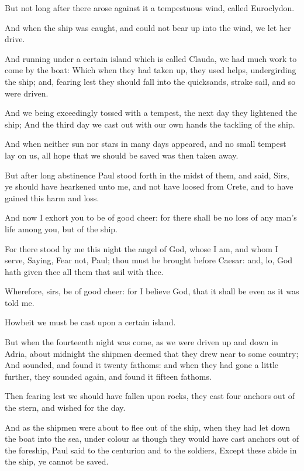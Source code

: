 \Verse But not long after there arose against it a tempestuous wind, called Euroclydon.

\Verse And when the ship was caught, and could not bear up into the wind, we let her drive.

\Verse And running under a certain island which is called Clauda, we had much work to come by the boat: \Verse Which when they had taken up, they used helps, undergirding the ship; and, fearing lest they should fall into the quicksands, strake sail, and so were driven.

\Verse And we being exceedingly tossed with a tempest, the next day they lightened the ship; \Verse And the third day we cast out with our own hands the tackling of the ship.

\Verse And when neither sun nor stars in many days appeared, and no small tempest lay on us, all hope that we should be saved was then taken away.

\Verse But after long abstinence Paul stood forth in the midst of them, and said, Sirs, ye should have hearkened unto me, and not have loosed from Crete, and to have gained this harm and loss.

\Verse And now I exhort you to be of good cheer: for there shall be no loss of any man's life among you, but of the ship.

\Verse For there stood by me this night the angel of God, whose I am, and whom I serve, \Verse Saying, Fear not, Paul; thou must be brought before Caesar: and, lo, God hath given thee all them that sail with thee.

\Verse Wherefore, sirs, be of good cheer: for I believe God, that it shall be even as it was told me.

\Verse Howbeit we must be cast upon a certain island.

\Verse But when the fourteenth night was come, as we were driven up and down in Adria, about midnight the shipmen deemed that they drew near to some country; \Verse And sounded, and found it twenty fathoms: and when they had gone a little further, they sounded again, and found it fifteen fathoms.

\Verse Then fearing lest we should have fallen upon rocks, they cast four anchors out of the stern, and wished for the day.

\Verse And as the shipmen were about to flee out of the ship, when they had let down the boat into the sea, under colour as though they would have cast anchors out of the foreship, \Verse Paul said to the centurion and to the soldiers, Except these abide in the ship, ye cannot be saved.

